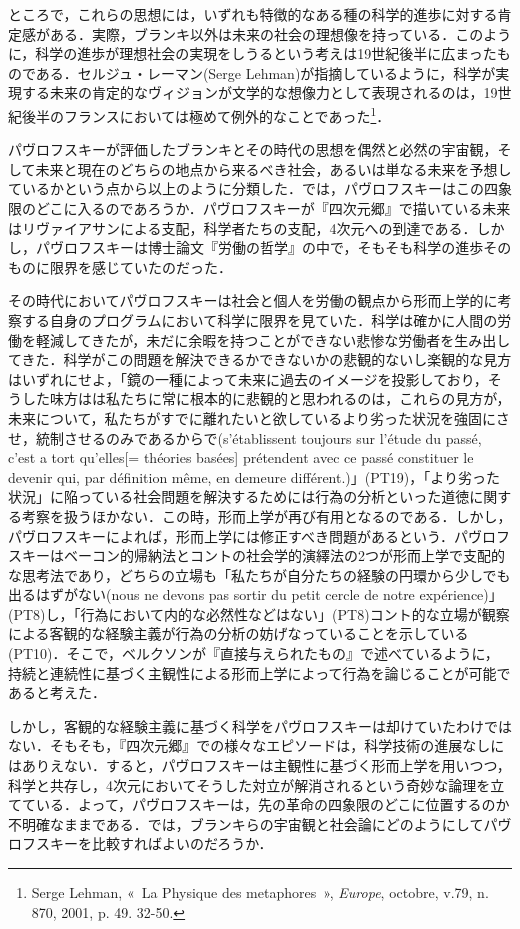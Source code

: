 ところで，これらの思想には，いずれも特徴的なある種の科学的進歩に対する肯定感がある．実際，ブランキ以外は未来の社会の理想像を持っている．このように，科学の進歩が理想社会の実現をしうるという考えは19世紀後半に広まったものである．セルジュ・レーマン(Serge Lehman)が指摘しているように，科学が実現する未来の肯定的なヴィジョンが文学的な想像力として表現されるのは，19世紀後半のフランスにおいては極めて例外的なことであった\footnote{Serge Lehman, «~La Physique des metaphores~», \emph{Europe}, octobre, v.79, n. 870, 2001, p. 49. 32-50.}．

パヴロフスキーが評価したブランキとその時代の思想を偶然と必然の宇宙観，そして未来と現在のどちらの地点から来るべき社会，あるいは単なる未来を予想しているかという点から以上のように分類した．では，パヴロフスキーはこの四象限のどこに入るのであろうか．パヴロフスキーが『四次元郷』で描いている未来はリヴァイアサンによる支配，科学者たちの支配，4次元への到達である．しかし，パヴロフスキーは博士論文『労働の哲学』の中で，そもそも科学の進歩そのものに限界を感じていたのだった．

その時代においてパヴロフスキーは社会と個人を労働の観点から形而上学的に考察する自身のプログラムにおいて科学に限界を見ていた．科学は確かに人間の労働を軽減してきたが，未だに余暇を持つことができない悲惨な労働者を生み出してきた．科学がこの問題を解決できるかできないかの悲観的ないし楽観的な見方はいずれにせよ，「鏡の一種によって未来に過去のイメージを投影しており，そうした味方はは私たちに常に根本的に悲観的と思われるのは，これらの見方が，未来について，私たちがすでに離れたいと欲しているより劣った状況を強固にさせ，統制させるのみであるからで(s’établissent toujours sur l’étude du passé, c’est a tort qu’elles[= théories basées] prétendent avec ce passé constituer le devenir qui, par définition même, en demeure différent.)」(PT19)，「より劣った状況」に陥っている社会問題を解決するためには行為の分析といった道徳に関する考察を扱うほかない．この時，形而上学が再び有用となるのである．しかし，パヴロフスキーによれば，形而上学には修正すべき問題があるという．パヴロフスキーはベーコン的帰納法とコントの社会学的演繹法の2つが形而上学で支配的な思考法であり，どちらの立場も「私たちが自分たちの経験の円環から少しでも出るはずがない(nous ne devons pas sortir du petit cercle de notre expérience)」(PT8)し，「行為において内的な必然性などはない」(PT8)コント的な立場が観察による客観的な経験主義が行為の分析の妨げなっていることを示している(PT10)．そこで，ベルクソンが『直接与えられたもの』で述べているように，持続と連続性に基づく主観性による形而上学によって行為を論じることが可能であると考えた．

しかし，客観的な経験主義に基づく科学をパヴロフスキーは却けていたわけではない．そもそも，『四次元郷』での様々なエピソードは，科学技術の進展なしにはありえない．すると，パヴロフスキーは主観性に基づく形而上学を用いつつ，科学と共存し，4次元においてそうした対立が解消されるという奇妙な論理を立てている．よって，パヴロフスキーは，先の革命の四象限のどこに位置するのか不明確なままである．では，ブランキらの宇宙観と社会論にどのようにしてパヴロフスキーを比較すればよいのだろうか．

